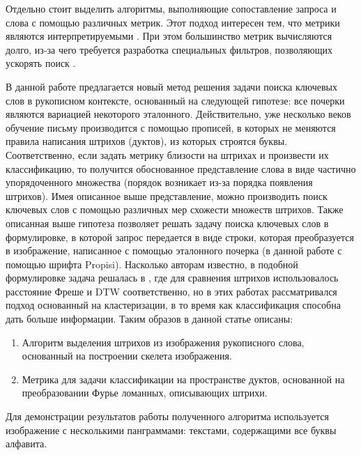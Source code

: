 \documentclass{article}
\begin{document}
\par Отдельно стоит выделить алгоритмы, выполняющие сопоставление запроса и слова с помощью различных метрик. Этот подход интересен тем, что метрики являются интерпретируемыми \citep{ameri2017keyword, stauffer2016graph}. При этом большинство метрик вычисляются долго, из-за чего требуется разработка специальных фильтров, позволяющих ускорять поиск \citep{stauffer2020filters}.
\par В данной работе предлагается новый метод решения задачи поиска ключевых слов в рукописном контексте, основанный на следующей гипотезе: все почерки являются вариацией некоторого эталонного. Действительно, уже несколько веков обучение письму производится с помощью прописей, в которых не меняются правила написания штрихов (дуктов), из которых строятся буквы. Соответственно, если задать метрику близости на штрихах и произвести их классификацию, то получится обоснованное представление слова в виде частично упорядоченного множества (порядок возникает из-за порядка появления штрихов). Имея описанное выше представление, можно производить поиск ключевых слов с помощью различных мер схожести множеств штрихов. Также описанная выше гипотеза позволяет решать задачу поиска ключевых слов в формулировке, в которой запрос передается в виде строки, которая преобразуется в изображение, написанное с помощью эталонного почерка (в данной работе с помощью шрифта Propisi). Насколько авторам известно, в подобной формулировке задача решалась в \citep{pronina2023frechet, pazazia2023dtw}, где для сравнения штрихов использовалось расстояние Фреше и DTW соответственно, но в этих работах рассматривался подход основанный на кластеризации, в то время как классификация способна дать больше информации. Таким образов в данной статье описаны:
\begin{enumerate}
\item Алгоритм выделения штрихов из изображения рукописного слова, основанный на построении скелета изображения.
\item Метрика для задачи классификации на пространстве дуктов, основанной на преобразовании Фурье ломанных, описывающих штрихи.
\end{enumerate}
Для демонстрации результатов работы полученного алгоритма используется изображение с несколькими панграммами: текстами, содержащими все буквы алфавита.
\end{document}

